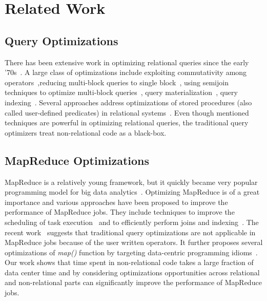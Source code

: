 \section{Related Work}
\subsection{Query Optimizations}
There has been extensive work in optimizing relational queries since the early '70s~\cite{Chaudhuri:1998}. A large class of optimizations include exploiting commutativity among operators~\cite{Chaudhuri:1994,Yan:1995},reducing multi-block queries to single block~\cite{Kim:1982,Muralikrishna:1992}, using semijoin techniques to optimize multi-block queries~\cite{Mumick:1994,Seshadri:1996}, query materialization~\cite{Chaudhuri:1995,Phan:2008}, query indexing~\cite{SELLIS1988175,Bertino:1989,Fang:2008}. Several approaches address optimizations of stored procedures (also called user-defined predicates) in relational systems~\cite{Hellerstein:1993,Chimenti:1989}. Even though mentioned techniques are powerful in optimizing relational queries, the traditional query optimizers treat non-relational code as a black-box.
\subsection{MapReduce Optimizations}
MapReduce is a relatively young framework, but it quickly became very popular programming model for big data analytics~\cite{Gates:2009}. Optimizing MapReduce is of a great importance and various approaches have been proposed to improve the performance of MapReduce jobs. They include techniques to improve the scheduling of task execution~\cite{Isard:2009,Zaharia:2008} and to efficiently perform joins and indexing~\cite{Dittrich:2010,Floratou:2011}. The recent work~\cite{Jahani:2011} suggests that traditional query optimizations are not applicable in MapReduce jobs because of the user written operators. It further proposes several optimizations of \emph{map()} function by targeting data-centric programming idioms~\cite{Jahani:2011}. Our work shows that time spent in non-relational code takes a large fraction of data center time and by considering optimizations opportunities across relational and non-relational parts can significantly improve the performance of MapReduce jobs.
